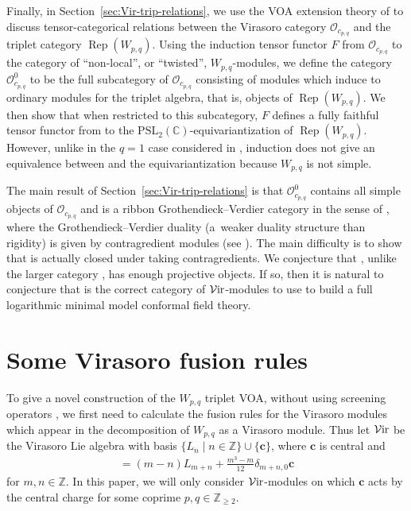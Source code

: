 \documentclass[pdftex]{sigma}
\numberwithin{equation}{section}
\theoremstyle{definition}
\begin{document}
Finally, in Section~\ref{sec:Vir-trip-relations}, we use the VOA extension theory of \cite{CKM1, CMY1,HKL} to discuss tensor-categorical relations between the Virasoro category $\mathcal{O}_{c_{p,q}}$ and the triplet category $\operatorname{Rep}(W_{p,q})$. Using the induction tensor functor $F$ from $\mathcal{O}_{c_{p,q}}$ to the category of ``non-local'', or ``twisted'', $W_{p,q}$-modules, we define the category $\mathcal{O}_{c_{p,q}}^0$ to be the full subcategory of $\mathcal{O}_{c_{p,q}}$ consisting of modules which induce to ordinary modules for the triplet algebra, that is, objects of $\operatorname{Rep}(W_{p,q})$. We then show that when restricted to this subcategory, $F$ defines a fully faithful tensor functor from  to the $\mathrm{PSL}_2(\mathbb{C})$-equivariantization of $\operatorname{Rep}(W_{p,q})$. However, unlike in the $q=1$ case considered in \cite[Section~7]{MY-cp1-Vir}, induction does not give an equivalence between  and the equivariantization  because $W_{p,q}$ is not simple.

The main result of Section~\ref{sec:Vir-trip-relations} is that $\mathcal{O}_{c_{p,q}}^0$ contains all simple objects of $\mathcal{O}_{c_{p,q}}$ and is a ribbon Grothendieck--Verdier category in the sense of \cite{BD}, where the Grothendieck--Verdier duality (a~weaker duality structure than rigidity) is given by contragredient modules (see \cite{ALSW}). The main difficulty is to show that  is actually closed under taking contragredients. We conjecture that , unlike the larger category , has enough projective objects. If so, then it is natural to conjecture that  is the correct category of $\mathcal{V}{\rm ir}$-modules to use to build a full logarithmic minimal model conformal field theory.

\section{Some Virasoro fusion rules}\label{sec:Vir-fus-rules}

To give a novel construction of the $W_{p,q}$ triplet VOA, without using screening operators \cite{FGST1-Log, FGST2-KL-dual}, we first need to calculate the fusion rules for the Virasoro modules which appear in the decomposition of $W_{p,q}$ as a Virasoro module. Thus let $\mathcal{V}{\rm ir}$ be the Virasoro Lie algebra with basis $\lbrace L_n\mid n\in\mathbb{Z}\rbrace\cup\lbrace\mathbf{c}\rbrace$, where $\mathbf{c}$ is central and
\begin{gather*}
[L_m,L_n]=(m-n)L_{m+n} +\frac{m^3-m}{12}\delta_{m+n,0}\mathbf{c}
\end{gather*}
for $m,n\in\mathbb{Z}$. In this paper, we will only consider $\mathcal{V}{\rm ir}$-modules on which $\mathbf{c}$ acts by the central charge
for some coprime $p,q\in\mathbb{Z}_{\geq 2}$.
\end{document}
